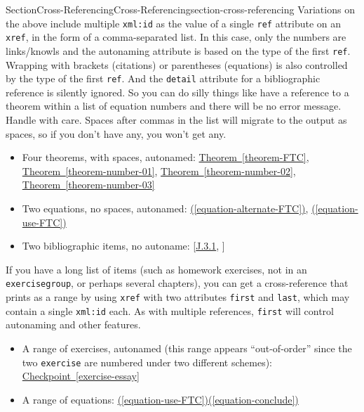 \documentclass[twoside,10pt,]{article}
\newcommand{\xreffont}{\relax}
\newcommand{\mono}[1]{\texttt{#1}}
\numberwithin{equation}{section}
\begin{document}
\begin{sectionptx}{Section}{Cross-Referencing}{}{Cross-Referencing}{}{}{section-cross-referencing}
Variations on the above include multiple \mono{xml:id} as the value of a single \mono{ref} attribute on an \mono{xref}, in the form of a comma-separated list.  In this case, only the numbers are links\slash{}knowls and the autonaming attribute is based on the type of the first \mono{ref}.  Wrapping with brackets (citations) or parentheses (equations) is also controlled by the type of the first \mono{ref}.  And the \mono{detail} attribute for a bibliographic reference is silently ignored.  So you can do silly things like have a reference to a theorem within a list of equation numbers and there will be no error message.  Handle with care.  Spaces after commas in the list will migrate to the output as spaces, so if you don't have any, you won't get any.%
\begin{itemize}[label=\textbullet]
\item{}Four theorems, with spaces, autonamed: \hyperref[theorem-FTC]{Theorem~{\xreffont\ref{theorem-FTC}}}, \hyperref[theorem-number-01]{Theorem~{\xreffont\ref{theorem-number-01}}}, \hyperref[theorem-number-02]{Theorem~{\xreffont\ref{theorem-number-02}}}, \hyperref[theorem-number-03]{Theorem~{\xreffont\ref{theorem-number-03}}}%
\item{}Two equations, no spaces, autonamed: \hyperref[equation-alternate-FTC]{({\xreffont\ref{equation-alternate-FTC}})}, \hyperref[equation-use-FTC]{({\xreffont\ref{equation-use-FTC}})}%
\item{}Two bibliographic items, no autoname: [\hyperlink{biblio-judson-AATA}{{\xreffont J.3.1}}, \hyperlink{biblio-lay-article}{{\xreffont 2}}]%
\end{itemize}
%
\par
If you have a long list of items (such as homework exercises, not in an \mono{exercisegroup}, or perhaps several chapters), you can get a cross-reference that prints as a range by using \mono{xref} with two attributes \mono{first} and \mono{last}, which may contain a single \mono{xml:id} each.  As with multiple references, \mono{first} will control autonaming and other features.%
\begin{itemize}[label=\textbullet]
\item{}A range of exercises, autonamed (this range appears ``out-of-order'' since the two \mono{exercise} are numbered under two different schemes): \hyperref[exercise-essay]{Checkpoint~{\xreffont\ref{exercise-essay}}\textendash{}{\xreffont 4.2.3.1}}%
\item{}A range of equations: \hyperref[equation-use-FTC]{({\xreffont\ref{equation-use-FTC}})\textendash{}({\xreffont\ref{equation-conclude}})}%

\end{itemize}
\end{sectionptx}
\end{document}
